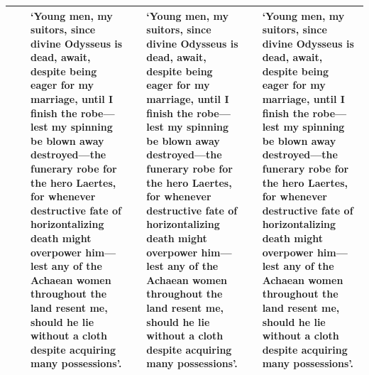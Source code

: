 \documentclass[12pt]{article}
\begin{document}
\begin{table}
\begin{singlespacing}
\begin{tiny}
\begin{center}
\begin{tabularx}{\textheight}{
|c
||c
:>{\lefting\arraybackslash}X
||c
:>{\lefting\arraybackslash}X
||c
:>{\lefting\arraybackslash}X
|
}
\hline
\parbox{}{} & \parbox{}{} & `Young men, my suitors, since divine Odysseus is dead, await, despite being eager for my marriage, until I finish the robe---lest my spinning be blown away destroyed---the funerary robe for the hero Laertes, for whenever destructive fate of horizontalizing death might overpower him---lest any of the Achaean women throughout the land resent me, should he lie without a cloth despite acquiring many possessions'. & \parbox{}{} & `Young men, my suitors, since divine Odysseus is dead, await, despite being eager for my marriage, until I finish the robe---lest my spinning be blown away destroyed---the funerary robe for the hero Laertes, for whenever destructive fate of horizontalizing death might overpower him---lest any of the Achaean women throughout the land resent me, should he lie without a cloth despite acquiring many possessions'. & \parbox{}{} & `Young men, my suitors, since divine Odysseus is dead, await, despite being eager for my marriage, until I finish the robe---lest my spinning be blown away destroyed---the funerary robe for the hero Laertes, for whenever destructive fate of horizontalizing death might overpower him---lest any of the Achaean women throughout the land resent me, should he lie without a cloth despite acquiring many possessions'. \\
\hline

\end{tabularx}
\end{center}
\end{tiny}
\end{singlespacing}
\end{table}
\end{document}
